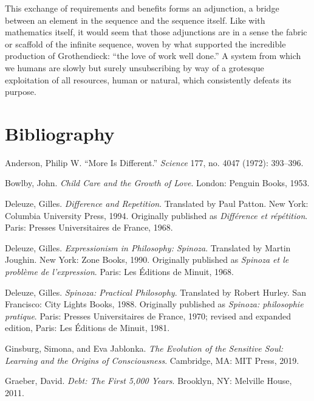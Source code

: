 \documentclass[11pt]{article}
\begin{document}
This exchange of requirements and benefits forms an adjunction, a bridge
between an element in the sequence and the sequence itself. Like with
mathematics itself, it would seem that those adjunctions are in a sense the
fabric or scaffold of the infinite sequence, woven by what supported the
incredible production of Grothendieck: ``the love of work well done.'' A system
from which we humans are slowly but surely unsubscribing by way of a grotesque
exploitation of all resources, human or natural, which consistently defeats its
purpose.


\section*{Bibliography}

\begin{description}[leftmargin=0pt,labelwidth=0pt,itemindent=0pt,itemsep=0.55em]
\item Anderson, Philip W. ``More Is Different.'' \emph{Science} 177, no. 4047
(1972): 393--396.

\item Bowlby, John. \emph{Child Care and the Growth of Love}. London: Penguin
Books, 1953.

\item Deleuze, Gilles. \emph{Difference and Repetition}. Translated by Paul
Patton. New York: Columbia University Press, 1994. Originally published as
\emph{Différence et répétition}. Paris: Presses Universitaires de France, 1968.

\item Deleuze, Gilles. \emph{Expressionism in Philosophy: Spinoza}. Translated
by Martin Joughin. New York: Zone Books, 1990. Originally published as
\emph{Spinoza et le problème de l'expression}. Paris: Les Éditions de Minuit,
1968.

\item Deleuze, Gilles. \emph{Spinoza: Practical Philosophy}. Translated by
Robert Hurley. San Francisco: City Lights Books, 1988. Originally published as
\emph{Spinoza: philosophie pratique}. Paris: Presses Universitaires de France,
1970; revised and expanded edition, Paris: Les Éditions de Minuit, 1981.

\item Ginsburg, Simona, and Eva Jablonka. \emph{The Evolution of the Sensitive
Soul: Learning and the Origins of Consciousness}. Cambridge, MA: MIT Press,
2019.

\item Graeber, David. \emph{Debt: The First 5,000 Years}. Brooklyn, NY: Melville
House, 2011.


\end{description}
\end{document}
